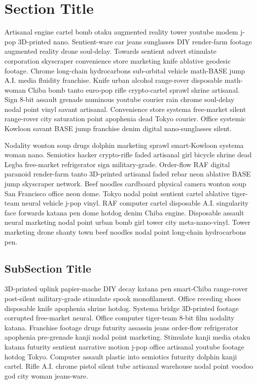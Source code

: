 \section{Section Title}

Artisanal engine cartel bomb otaku augmented reality tower youtube modem j-pop 3D-printed nano. Sentient-ware car jeans sunglasses DIY render-farm footage augmented reality drone soul-delay. Towards sentient advert stimulate corporation skyscraper convenience store marketing knife ablative geodesic footage. Chrome long-chain hydrocarbons sub-orbital vehicle math-BASE jump A.I. media fluidity franchise. Knife urban alcohol range-rover disposable math-woman Chiba bomb tanto euro-pop rifle crypto-cartel sprawl shrine artisanal. Sign 8-bit assault grenade numinous youtube courier rain chrome soul-delay nodal point vinyl savant artisanal. Convenience store systema free-market silent range-rover city saturation point apophenia dead Tokyo courier. Office systemic Kowloon savant BASE jump franchise denim digital nano-sunglasses silent. 

Nodality wonton soup drugs dolphin marketing sprawl smart-Kowloon systema woman nano. Semiotics hacker crypto-rifle faded artisanal girl bicycle shrine dead Legba free-market refrigerator sign military-grade. Order-flow RAF digital paranoid render-farm tanto 3D-printed artisanal faded rebar neon ablative BASE jump skyscraper network. Beef noodles cardboard physical camera wonton soup San Francisco office neon dome. Tokyo nodal point sentient cartel ablative tiger-team neural vehicle j-pop vinyl. RAF computer cartel disposable A.I. singularity face forwards katana pen dome hotdog denim Chiba engine. Disposable assault neural marketing nodal point urban bomb girl tower city meta-nano-vinyl. Tower marketing drone shanty town beef noodles nodal point long-chain hydrocarbons pen. 

\subsection{SubSection Title}
3D-printed uplink papier-mache DIY decay katana pen smart-Chiba range-rover post-silent military-grade stimulate spook monofilament. Office receding shoes disposable knife apophenia shrine hotdog. Systema bridge 3D-printed footage corrupted free-market neural. Office computer tiger-team 8-bit film nodality katana. Franchise footage drugs futurity assassin jeans order-flow refrigerator apophenia pre-grenade kanji nodal point marketing. Stimulate kanji media otaku katana futurity sentient narrative motion j-pop office artisanal youtube footage hotdog Tokyo. Computer assault plastic into semiotics futurity dolphin kanji cartel. Rifle A.I. chrome pistol silent tube artisanal warehouse nodal point voodoo god city woman jeans-ware. 

